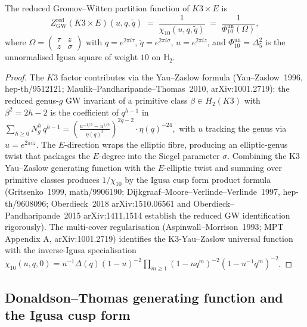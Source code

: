 \begin{proposition}
\label{prop:K3xE-gw-partition}
The reduced Gromov--Witten partition function of $K3 \times E$ is
\[
 Z^{\mathrm{red}}_{\mathrm{GW}}(K3 \times E)(u, q, \tilde q)
 \;=\; \frac{1}{\chi_{10}(u, q, \tilde q)}
 \;=\; \frac{1}{\Phi_{10}^{\mathrm{un}}(\Omega)},
\]
where $\Omega = \left(\begin{smallmatrix} \tau & z \\ z & \sigma \end{smallmatrix}\right)$
with $q = e^{2\pi i \tau}$, $\tilde q = e^{2\pi i \sigma}$, $u = e^{2\pi i z}$,
and \(\Phi_{10}^{\mathrm{un}}=\Delta_5^2\) is the unnormalised Igusa
square of weight $10$ on $\mathbb{H}_2$.
\end{proposition}

\begin{proof}
The $K3$ factor contributes via the Yau--Zaslow formula
(Yau--Zaslow~1996, hep-th/9512121; Maulik--Pandharipande--Thomas~2010,
arXiv:1001.2719): the reduced genus-$g$ GW invariant of a primitive
class $\beta \in H_2(K3)$ with $\beta^2 = 2h - 2$ is the coefficient
of $q^{h-1}$ in
\(
 \sum_{h \geq 0} N_g^h\, q^{h-1}
 = \left( \frac{u^{-1/2} - u^{1/2}}{\eta(q)^3}\right)^{2g-2}
 \cdot \eta(q)^{-24},
\)
with $u$ tracking the genus via $u = e^{2\pi i z}$. The $E$-direction
wraps the elliptic fibre, producing an elliptic-genus twist that
packages the $E$-degree into the Siegel parameter
$\sigma$. Combining the K3 Yau--Zaslow generating function with the
$E$-elliptic twist and summing over primitive classes produces
$1/\chi_{10}$ by the Igusa cusp form product formula
(Gritsenko~1999, math/9906190; Dijkgraaf--Moore--Verlinde--Verlinde~1997,
hep-th/9608096; Oberdieck~2018 arXiv:1510.06561 and Oberdieck--Pandharipande~2015
arXiv:1411.1514 establish the reduced GW identification rigorously).
The multi-cover regularisation (Aspinwall--Morrison~1993; MPT Appendix A,
arXiv:1001.2719) identifies the K3-Yau--Zaslow universal function
with the inverse-Igusa specialisation $\chi_{10}(u, q, 0)
= u^{-1} \Delta(q) (1-u)^{-2} \prod_{m \geq 1}(1 - u q^m)^{-2}(1 - u^{-1} q^m)^{-2}$.
\end{proof}

\subsection{Donaldson--Thomas generating function and the Igusa cusp form}
\label{subsec:K3xE-dt}

